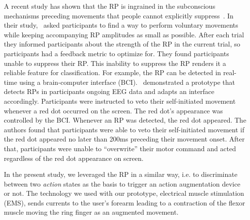 A recent study has shown that the RP is ingrained in the subconscious mechanisms preceding movements that people cannot explicitly suppress~\cite{Schultze-Kraft2021-cu}. In their study,~\citet{Schultze-Kraft2021-cu} asked participants to find a way to perform voluntary movements while keeping accompanying RP amplitudes as small as possible. After each trial they informed participants about the strength of the RP in the current trial, so participants had a feedback metric to optimize for. They found participants unable to suppress their RP. This inability to suppress the RP renders it a reliable feature for classification. For example, the RP can be detected in real-time using a brain-computer interface (BCI).~\citet{Schultze-Kraft2016-bx} demonstrated a prototype that detects RPs in participants ongoing EEG data and adapts an interface accordingly. Participants were instructed to veto their self-initiated movement whenever a red dot occurred on the screen. The red dot's appearance was controlled by the BCI. Whenever an RP was detected, the red dot appeared. The authors found that participants were able to veto their self-initiated movement if the red dot appeared no later than 200ms preceding their movement onset. After that, participants were unable to ``overwrite'' their motor command and acted regardless of the red dot appearance on screen. 

In the present study, we leveraged the RP in a similar way, i.e. to discriminate between two \textit{action} states as the basis to trigger an action augmentation device or not. The technology we used with our prototype, electrical muscle stimulation (EMS), sends currents to the user's forearm leading to a contraction of the flexor muscle moving the ring finger as an augmented movement.




